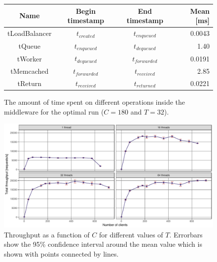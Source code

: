\documentclass[11pt]{article}
\begin{document}
\begin{figure}[h]
\begin{center}
	\begin{tabular}{|c|c|c|r|}
	\hline \textbf{Name} & \textbf{Begin timestamp} & \textbf{End timestamp} & \textbf{Mean [ms]} \\
	\hline tLoadBalancer & $t_{created}$ & $t_{enqueued}$ & 0.0043 \\
	\hline tQueue & $t_{enqueued}$ & $t_{dequeued}$ & 1.40 \\
	\hline tWorker & $t_{dequeued}$ & $t_{forwarded}$ & 0.0191 \\
	\hline tMemcached & $t_{forwarded}$ & $t_{received}$ & 2.85 \\
	\hline tReturn & $t_{received}$ & $t_{returned}$ & 0.0221 \\
	\end{tabular}
	\caption{The amount of time spent on different operations inside the middleware for the optimal run ($C=180$ and $T=32$).}
	\label{fig:exp1:table}
\end{center}
\end{figure}

\begin{figure}[p]
\centering
\includegraphics[width=\textwidth]{../results/throughput/graphs/tp_vs_clients.pdf}
\caption{Throughput as a function of $C$ for different values of $T$. Errorbars show the 95\% confidence interval around the mean value which is shown with points connected by lines.}
\label{fig:exp1:res:throughput}
\end{figure}
\end{document}
